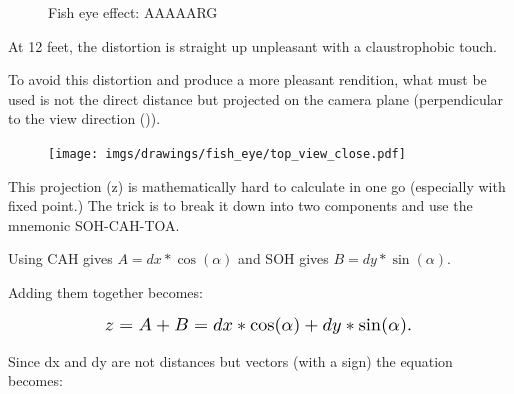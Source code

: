 \begin{minipage}{\textwidth}
 \begin{figure}[H]
\centering
 \caption{Fish eye effect: AAAAARG} \label{fig:mips}
 \end{figure}
 

\begin{minipage}{.4\textwidth}
At 12 feet, the distortion is straight up unpleasant with a claustrophobic touch.\\
\par
To avoid this distortion and produce a more pleasant rendition, what must be used is not the direct distance  but  projected on the camera plane (perpendicular to the view direction ()).
 \end{minipage}
\begin{minipage}{.6\textwidth}
 \begin{figure}[H]
  \begin{flushright}
  \texttt{[image: imgs/drawings/fish\_eye/top\_view\_close.pdf]}
 \end{flushright}
\end{figure}
 \end{minipage}
\end{minipage}
\par



\begin{figure}[H]

 
\label{fig:Raycasting2}
 
\end{figure}

This projection (z) is mathematically hard to calculate in one go (especially with fixed point.) The trick is to break it down into two components and use the mnemonic SOH-CAH-TOA.\\


\begin{figure}[H]
\centering
 
 
\end{figure}
Using CAH gives $A = dx * \cos(\alpha)$ and SOH gives $B = dy * \sin(\alpha) $.\\
\par

Adding them together becomes:
\par
\begin{figure}[H]
  \centering
  \begin{equation*}
    \scalebox{1.3}{
$z = A + B = dx * \cos(\alpha) + dy * \sin(\alpha) $. 
 }
  \end{equation*}
\end{figure}
Since dx and dy are not distances but vectors (with a sign) the equation becomes: 


